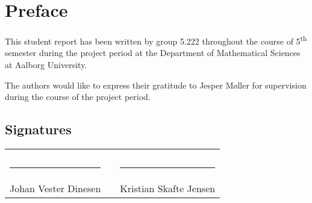 \section*{Preface}


This student report has been written by group 5.222 throughout the course of 5\textsuperscript{th} semester during the project period at the Department of Mathematical Sciences at Aalborg University.

The authors would like to express their gratitude to Jesper Møller for supervision during the course of the project period.
\vfill

\subsection*{Signatures}
\begin{tabular}{lcl}
    & &\\
    & &\\
    \rule{7cm}{1pt} & \hspace{0.5cm} & \rule{7cm}{1pt} \\
    \vspace{1.5cm}
    Johan Vester Dinesen & & Kristian Skafte Jensen
\end{tabular}
\vspace{1cm}
